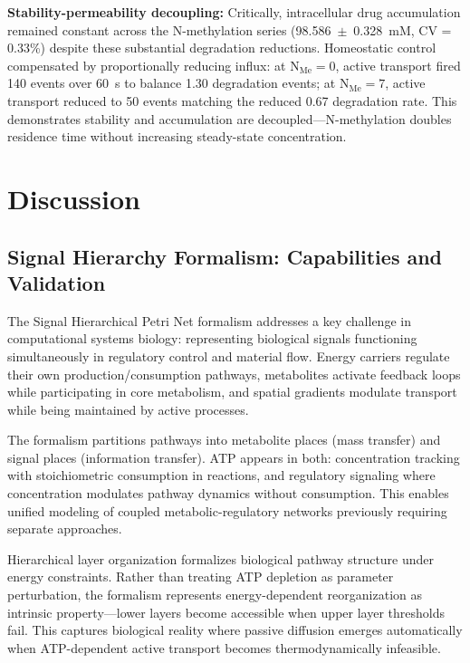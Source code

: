 \documentclass[10pt,letterpaper]{article}
\begin{document}
\textbf{Stability-permeability decoupling:} Critically, intracellular drug accumulation remained constant across the N-methylation series (98.586~$\pm$~0.328~mM, CV = 0.33\%) despite these substantial degradation reductions. Homeostatic control compensated by proportionally reducing influx: at N$_{\text{Me}} = 0$, active transport fired 140 events over 60~s to balance 1.30 degradation events; at N$_{\text{Me}} = 7$, active transport reduced to 50 events matching the reduced 0.67 degradation rate. This demonstrates stability and accumulation are decoupled---N-methylation doubles residence time without increasing steady-state concentration.

\section{Discussion}
\label{sec:discussion}

\subsection{Signal Hierarchy Formalism: Capabilities and Validation}

The Signal Hierarchical Petri Net formalism addresses a key challenge in computational systems biology: representing biological signals functioning simultaneously in regulatory control and material flow. Energy carriers regulate their own production/consumption pathways, metabolites activate feedback loops while participating in core metabolism, and spatial gradients modulate transport while being maintained by active processes.

The formalism partitions pathways into metabolite places (mass transfer) and signal places (information transfer). ATP appears in both: concentration tracking with stoichiometric consumption in reactions, and regulatory signaling where concentration modulates pathway dynamics without consumption. This enables unified modeling of coupled metabolic-regulatory networks previously requiring separate approaches.

Hierarchical layer organization formalizes biological pathway structure under energy constraints. Rather than treating ATP depletion as parameter perturbation, the formalism represents energy-dependent reorganization as intrinsic property---lower layers become accessible when upper layer thresholds fail. This captures biological reality where passive diffusion emerges automatically when ATP-dependent active transport becomes thermodynamically infeasible.
\end{document}
